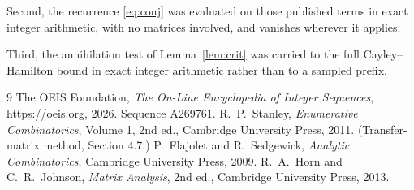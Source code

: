 \documentclass[11pt,a4paper]{article}
\theoremstyle{plain}
\theoremstyle{definition}
\begin{document}
Second, the recurrence \eqref{eq:conj} was evaluated on those published terms in exact
integer arithmetic, with no matrices involved, and vanishes wherever it applies.

Third, the annihilation test of Lemma~\ref{lem:crit} was carried to the full
Cayley--Hamilton bound in exact integer arithmetic rather than to a sampled prefix.

\begin{thebibliography}{9}
 The OEIS Foundation, \emph{The On-Line Encyclopedia of Integer
Sequences}, \url{https://oeis.org}, 2026. Sequence A269761.
 R.~P.~Stanley, \emph{Enumerative Combinatorics}, Volume 1, 2nd ed.,
Cambridge University Press, 2011. (Transfer-matrix method, Section 4.7.)
 P.~Flajolet and R.~Sedgewick, \emph{Analytic Combinatorics}, Cambridge
University Press, 2009.
 R.~A.~Horn and C.~R.~Johnson, \emph{Matrix Analysis}, 2nd ed., Cambridge
University Press, 2013.
\end{thebibliography}
\end{document}
